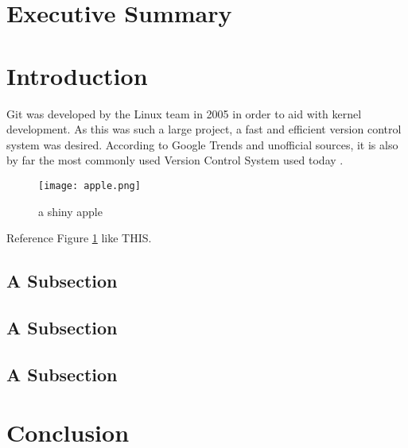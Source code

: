 


\section{Executive Summary}

\section{Introduction}

Git was developed by the Linux team in 2005 in order to aid with kernel development.
As this was such a large project, a fast and efficient version control system was desired.
According to Google Trends and unofficial sources, it is also by far the most commonly used Version Control System used today \cite{vcs-stats}\cite{vcs-google-trends}.

\begin{figure}[H]
    \centering
    \texttt{[image: apple.png]}
    \caption{a shiny apple}
    \label{fig:apple1}
\end{figure}

Reference Figure \ref{fig:apple1} like THIS.


\subsection{A Subsection}

\subsection{A Subsection}


\subsection{A Subsection}


\section{Conclusion}

\lipsum[16]

\newpage



